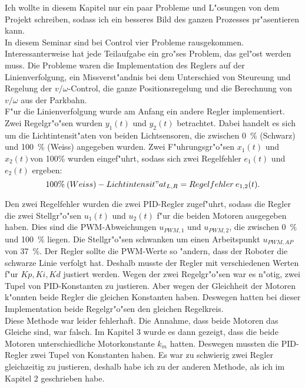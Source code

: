 Ich wollte in diesem Kapitel nur ein paar Probleme und L"osungen von dem Projekt schreiben, sodass ich ein besseres Bild des ganzen Prozesses pr"asentieren kann. \\

In diesem Seminar sind bei Control vier Probleme rausgekommen. Interessanterweise hat jede Teilaufgabe ein gro"ses Problem, das gel"ost werden muss. Die Probleme waren die Implementation des Reglers auf der Linienverfolgung, ein Missverst"andnis bei dem Unterschied von Steureung und Regelung der \(v/\omega\)-Control, die ganze Positionsregelung und die Berechnung von \(v/\omega\) aus der Parkbahn. \\

F"ur die Linienverfolgung wurde am Anfang ein andere Regler implementiert. Zwei Regelgr"o"sen wurden $y_1(t)$ und \(y_2(t)\) betrachtet. Dabei handelt es sich um die Lichtintensit"aten von beiden Lichtsensoren, die zwischen \si{0\percent} (Schwarz) und \si{100\percent} (Weiss) angegeben wurden. Zwei F"uhrungsgr"o"sen $x_1(t)$ und $x_2(t)$von 100\% wurden eingef"uhrt, sodass sich zwei Regelfehler $e_1(t)$ und $e_2(t)$ ergeben:
\begin{equation*}
    \si{100\percent} \: (Weiss) - Lichtintensit"at_{L,R} = Regelfehler \: e_{1,2}(t).
\end{equation*}

Den zwei Regelfehler wurden die zwei PID-Regler zugef"uhrt, sodass die Regler die zwei Stellgr"o"sen \(u_1(t)\) und \(u_2(t)\) f"ur die beiden Motoren ausgegeben haben. Dies sind die PWM-Abweichungen \(u_{PWM,1}\) und \(u_{PWM,2}\), die zwischen \si{0\percent} und \si{100\percent} liegen. Die Stellgr"o"sen schwanken um einen Arbeitspunkt \(u_{PWM,AP}\) von \si{37\percent}. Der Regler sollte die PWM-Werte so "andern, dass der Roboter die schwarze Linie verfolgt hat. Deshalb musste der Regler mit verschiedenen Werten f"ur \(Kp, Ki, Kd\) justiert werden. Wegen der zwei Regelgr"o"sen war es n"otig, zwei Tupel von PID-Konstanten zu justieren. Aber wegen der Gleichheit der Motoren k"onnten beide Regler die gleichen Konstanten haben. Deswegen hatten bei dieser Implementation beide Regelgr"o"sen den gleichen Regelkreis. \\

Diese Methode war leider fehlerhaft. Die Annahme, dass beide Motoren das Gleiche sind, war falsch. Im Kapitel 3 wurde es dann gezeigt, dass die beide Motoren unterschiedliche Motorkonstante \(k_m\) hatten. Deswegen mussten die PID-Regler zwei Tupel von Konstanten haben. Es war zu schwierig zwei Regler gleichzeitig zu justieren, deshalb habe ich zu der anderen Methode, als ich im Kapitel 2 geschrieben habe. \\

